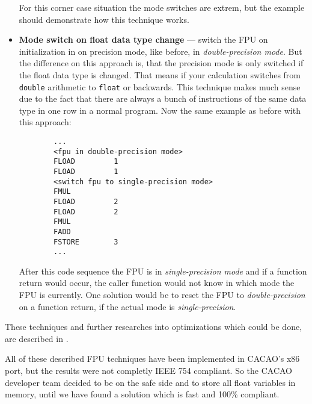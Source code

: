 \begin{itemize}
 For this corner case situation the mode switches are extrem, but the
 example should demonstrate how this technique works.

 \item \textbf{Mode switch on float data type change} --- switch the
 FPU on initialization in on precision mode, like before, in
 \textit{double-precision mode}. But the difference on this approach
 is, that the precision mode is only switched if the float data type
 is changed. That means if your calculation switches from
 \texttt{double} arithmetic to \texttt{float} or backwards. This
 technique makes much sense due to the fact that there are always a
 bunch of instructions of the same data type in one row in a normal
 program. Now the same example as before with this approach:

 \begin{verbatim}
        ...
        <fpu in double-precision mode>
        FLOAD         1
        FLOAD         1
        <switch fpu to single-precision mode>
        FMUL         
        FLOAD         2
        FLOAD         2
        FMUL         
        FADD         
        FSTORE        3
        ...
 \end{verbatim}

 After this code sequence the FPU is in \textit{single-precision mode}
 and if a function return would occur, the caller function would not
 know in which mode the FPU is currently. One solution would be to
 reset the FPU to \textit{double-precision} on a function return, if
 the actual mode is \textit{single-precision}.
\end{itemize}

These techniques and further researches into optimizations which could
be done, are described in \cite{OgKoNa02}.

All of these described FPU techniques have been implemented in CACAO's
x86 port, but the results were not completly IEEE 754 compliant. So
the CACAO developer team decided to be on the safe side and to store
all float variables in memory, until we have found a solution which is
fast and 100\% compliant.
